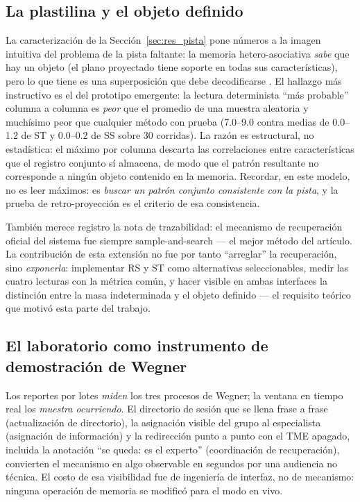 \subsection{La plastilina y el objeto definido}

La caracterización de la Sección~\ref{sec:res_pista} pone números a la imagen
intuitiva del problema de la pista faltante: la memoria hetero-asociativa \emph{sabe}
que hay un objeto (el plano proyectado tiene soporte en todas sus características),
pero lo que tiene es una superposición que debe decodificarse
\cite{morales2025missing}.
El hallazgo más instructivo es el del prototipo emergente: la lectura determinista
``más probable'' columna a columna es \emph{peor} que el promedio de una muestra
aleatoria y muchísimo peor que cualquier método con prueba (7.0--9.0 contra medias
de 0.0--1.2 de ST y 0.0--0.2 de SS sobre 30 corridas).
La razón es estructural, no estadística: el máximo por columna descarta las
correlaciones entre características que el registro conjunto sí almacena, de modo que
el patrón resultante no corresponde a ningún objeto contenido en la memoria.
Recordar, en este modelo, no es leer máximos: es \emph{buscar un patrón conjunto
consistente con la pista}, y la prueba de retro-proyección es el criterio de esa
consistencia.

También merece registro la nota de trazabilidad: el mecanismo de recuperación oficial
del sistema fue siempre sample-and-search --- el mejor método del artículo.
La contribución de esta extensión no fue por tanto ``arreglar'' la recuperación, sino
\emph{exponerla}: implementar RS y ST como alternativas seleccionables, medir las
cuatro lecturas con la métrica común, y hacer visible en ambas interfaces la
distinción entre la masa indeterminada y el objeto definido --- el requisito teórico
que motivó esta parte del trabajo.

\subsection{El laboratorio como instrumento de demostración de Wegner}

Los reportes por lotes \emph{miden} los tres procesos de Wegner; la ventana en tiempo
real los \emph{muestra ocurriendo}.
El directorio de sesión que se llena frase a frase (actualización de directorio), la
asignación visible del grupo al especialista (asignación de información) y la
redirección punto a punto con el TME apagado, incluida la anotación ``se queda: es el
experto'' (coordinación de recuperación), convierten el mecanismo en algo observable
en segundos por una audiencia no técnica.
El costo de esa visibilidad fue de ingeniería de interfaz, no de mecanismo: ninguna
operación de memoria se modificó para el modo en vivo.

